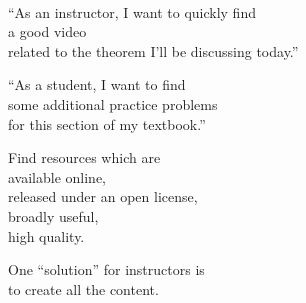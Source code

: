 \documentclass{chalkboard}
\begin{document}
\begin{frame}[nofills]
\vfill

 \\[24pt]

\vfill
\end{frame}

\begin{frame}
  \huge 

  ``As an instructor, I want to quickly find \\
  \quad a good video \\
  \quad\quad related to the theorem I'll be discussing today.''

  \vfill

  ``As a student, I want to find \\
  \quad some additional practice problems \\
  \quad\quad for this section of my textbook.''
\end{frame}

\begin{frame}
  \huge

  Find resources which are \\
  \quad available online, \\
  \quad released under an open license, \\
  \quad broadly useful, \\
  \quad high quality.

  \vfill

  One ``solution'' for instructors is \\
  \quad to create all the content.

\end{frame}


\begin{frame}[nofills]
\vfill

 \\[24pt]

\begin{center}\end{center}


\vfill

\end{frame}
\end{document}
